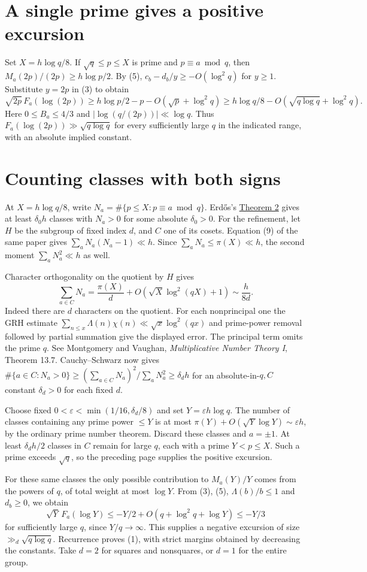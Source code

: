 \documentclass[11pt,a4paper]{article}
\newcommand{\head}[1]{\section*{\color{ink}#1}}
\begin{document}
\head{A single prime gives a positive excursion}
Set \(X=h\log q/8\). If \(\sqrt q\le p\le X\) is prime and \(p\equiv a\bmod q\),
then \(M_a(2p)/(2p)\ge h\log p/2\). By (5),
\(c_b-d_b/y\ge-O(\log^2q)\) for \(y\ge1\). Substitute \(y=2p\) in (3) to obtain
\[
 \sqrt{2p}\,F_a(\log(2p))
  \ge h\log p/2-p-O\!\left(\sqrt p+\log^2q\right)
  \ge h\log q/8-O\!\left(\sqrt{q\log q}+\log^2q\right).
\]
Here \(0\le B_a\le4/3\) and \(|\log(q/(2p))|\ll\log q\).
Thus \(F_a(\log(2p))\gg\sqrt{q\log q}\) for every sufficiently large \(q\)
in the indicated range, with an absolute implied constant.

\newpage
\head{Counting classes with both signs}
At \(X=h\log q/8\), write \(N_a=\#\{p\le X:p\equiv a\bmod q\}\).
Erd\H{o}s's \href{https://www.renyi.hu/~p_erdos/1949-05.pdf}{Theorem 2}
gives at least \(\delta_0 h\) classes with \(N_a>0\) for some absolute \(\delta_0>0\).
For the refinement, let \(H\) be the subgroup of fixed index \(d\), and \(C\) one
of its cosets. Equation (9) of the same paper gives
\(\sum_a N_a(N_a-1)\ll h\). Since \(\sum_aN_a\le\pi(X)\ll h\), the second moment
\(\sum_aN_a^2\ll h\) as well.

Character orthogonality on the quotient by \(H\) gives
\[
 \sum_{a\in C}N_a=\frac{\pi(X)}{d}+O\!\left(\sqrt X\log^2(qX)+1\right)
                 \sim\frac{h}{8d}.
\]
Indeed there are \(d\) characters on the quotient. For each nonprincipal one
the GRH estimate \(\sum_{n\le x}\Lambda(n)\chi(n)\ll\sqrt{x}\log^2(qx)\)
and prime-power removal followed by partial summation give the displayed error.
The principal term omits the prime \(q\). See Montgomery and Vaughan,
\emph{Multiplicative Number Theory I}, Theorem 13.7. Cauchy--Schwarz now gives
\(\#\{a\in C:N_a>0\}\ge(\sum_{a\in C}N_a)^2/\sum_aN_a^2\ge\delta_d h\)
for an absolute-in-\(q,C\) constant \(\delta_d>0\) for each fixed \(d\).

Choose fixed \(0<\varepsilon<\min(1/16,\delta_d/8)\) and set
\(Y=\varepsilon h\log q\). The number of classes containing any prime
power \(\le Y\) is at most \(\pi(Y)+O(\sqrt Y\log Y)\sim\varepsilon h\), by the
ordinary prime number theorem. Discard these classes and \(a=\pm1\). At least
\(\delta_d h/2\) classes in \(C\) remain for large \(q\), each with a prime
\(Y<p\le X\). Such a prime exceeds \(\sqrt q\), so the preceding page supplies
the positive excursion.

For these same classes the only possible contribution to \(M_a(Y)/Y\) comes from
the powers of \(q\), of total weight at most \(\log Y\). From (3), (5),
\(\Lambda(b)/b\le1\) and \(d_b\ge0\), we obtain
\[
 \sqrt{Y}\,F_a(\log Y)\le -Y/2+O(q+\log^2q+\log Y)\le -Y/3
\]
for sufficiently large \(q\), since \(Y/q\to\infty\). This supplies a negative
excursion of size \(\gg_d\sqrt{q\log q}\). Recurrence proves (1), with strict
margins obtained by decreasing the constants. Take \(d=2\) for squares and
nonsquares, or \(d=1\) for the entire group.
\end{document}
